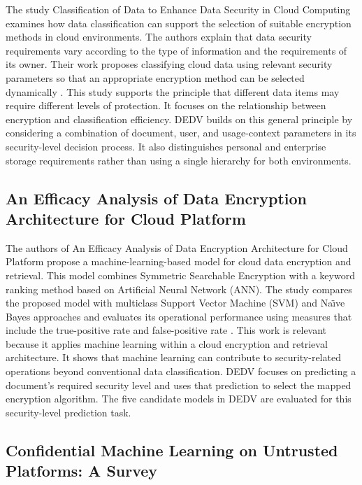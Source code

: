 \documentclass[pdflatex,sn-mathphys-num]{sn-jnl}
\begin{document}
The study Classification of Data to Enhance Data Security in Cloud Computing examines how data
classification can support the selection of suitable encryption methods in cloud environments.
The authors explain that data security requirements vary according to the type of information and
the requirements of its owner. Their work proposes classifying cloud data using relevant security
parameters so that an appropriate encryption method can be selected dynamically
\cite{singh2018classification}. This study supports the principle that different data items may
require different levels of protection. It focuses on the relationship between encryption and
classification efficiency. DEDV builds on this general principle by considering a combination of
document, user, and usage-context parameters in its security-level decision process. It also
distinguishes personal and enterprise storage requirements rather than using a single hierarchy
for both environments.

\subsection{An Efficacy Analysis of Data Encryption Architecture for Cloud Platform}

The authors of An Efficacy Analysis of Data Encryption Architecture for Cloud Platform propose a
machine-learning-based model for cloud data encryption and retrieval. This model combines
Symmetric Searchable Encryption with a keyword ranking method based on Artificial Neural Network
(ANN). The study compares the proposed model with multiclass Support Vector Machine (SVM) and
Na\"{\i}ve Bayes approaches and evaluates its operational performance using measures that include
the true-positive rate and false-positive rate \cite{malhotra2023efficacy}. This work is relevant
because it applies machine learning within a cloud encryption and retrieval architecture. It shows
that machine learning can contribute to security-related operations beyond conventional data
classification. DEDV focuses on predicting a document's required security level and uses that
prediction to select the mapped encryption algorithm. The five candidate models in DEDV are
evaluated for this security-level prediction task.

\subsection{Confidential Machine Learning on Untrusted Platforms: A Survey}
\end{document}
